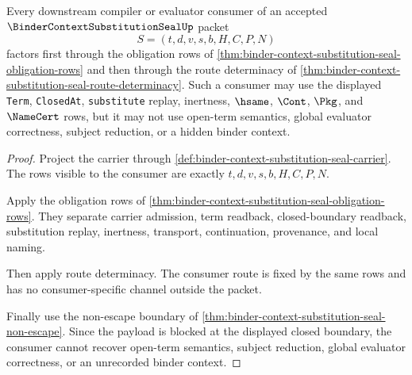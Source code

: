 \begin{theorem}
\label{thm:binder-context-substitution-seal-obligation-consumer}
Every downstream compiler or evaluator consumer of an accepted $\BinderContextSubstitutionSealUp$ packet
$$
S=(t,d,v,s,b,H,C,P,N)
$$
factors first through the obligation rows of \autoref{thm:binder-context-substitution-seal-obligation-rows} and then through the route determinacy of \autoref{thm:binder-context-substitution-seal-route-determinacy}. Such a consumer may use the displayed \texttt{Term}, \texttt{ClosedAt}, \texttt{substitute} replay, inertness, $\hsame$, $\Cont$, $\Pkg$, and $\NameCert$ rows, but it may not use open-term semantics, global evaluator correctness, subject reduction, or a hidden binder context.
\end{theorem}
\begin{proof}
Project the carrier through \autoref{def:binder-context-substitution-seal-carrier}. The rows visible to the consumer are exactly $t,d,v,s,b,H,C,P,N$.

Apply the obligation rows of \autoref{thm:binder-context-substitution-seal-obligation-rows}. They separate carrier admission, term readback, closed-boundary readback, substitution replay, inertness, transport, continuation, provenance, and local naming.

Then apply route determinacy. The consumer route is fixed by the same rows and has no consumer-specific channel outside the packet.

Finally use the non-escape boundary of \autoref{thm:binder-context-substitution-seal-non-escape}. Since the payload is blocked at the displayed closed boundary, the consumer cannot recover open-term semantics, subject reduction, global evaluator correctness, or an unrecorded binder context.
\end{proof}

